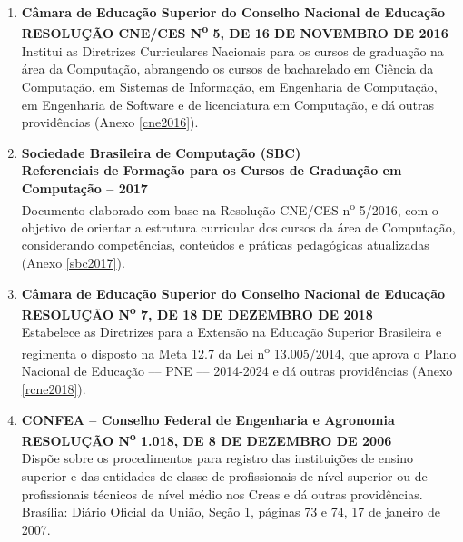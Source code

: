 \begin{enumerate}
    \item \textbf{Câmara de Educação Superior do Conselho Nacional de Educação}  \\
          \textbf{RESOLUÇÃO CNE/CES N\textsuperscript{o} 5, DE 16 DE NOVEMBRO DE 2016}  \\
          Institui as Diretrizes Curriculares Nacionais para os cursos de graduação na área da Computação, abrangendo os cursos de bacharelado em Ciência da Computação, em Sistemas de Informação, em Engenharia de Computação, em Engenharia de Software e de licenciatura em Computação, e dá outras providências (Anexo \ref{cne2016}).

    \item \textbf{Sociedade Brasileira de Computação (SBC)}  \\
          \textbf{Referenciais de Formação para os Cursos de Graduação em Computação – 2017} \\
          Documento elaborado com base na Resolução CNE/CES n\textsuperscript{o} 5/2016, com o objetivo de orientar a estrutura curricular dos cursos da área de Computação, considerando competências, conteúdos e práticas pedagógicas atualizadas (Anexo \ref{sbc2017}).

    \item \textbf{Câmara de Educação Superior do Conselho Nacional de Educação}  \\
          \textbf{RESOLUÇÃO N\textsuperscript{o} 7, DE 18 DE DEZEMBRO DE 2018}  \\
          Estabelece as Diretrizes para a Extensão na Educação Superior Brasileira e regimenta o disposto na Meta 12.7 da Lei n\textsuperscript{o} 13.005/2014, que aprova o Plano Nacional de Educação –-- PNE –-- 2014-2024 e dá outras providências (Anexo \ref{rcne2018}).

    \item \textbf{CONFEA – Conselho Federal de Engenharia e Agronomia} \\
          \textbf{RESOLUÇÃO N\textsuperscript{o} 1.018, DE 8 DE DEZEMBRO DE 2006}  \\
          Dispõe sobre os procedimentos para registro das instituições de ensino superior e das entidades de classe de profissionais de nível superior ou de profissionais técnicos de nível médio nos Creas e dá outras providências. Brasília: Diário Oficial da União, Seção 1, páginas 73 e 74, 17 de janeiro de 2007.
\end{enumerate}


